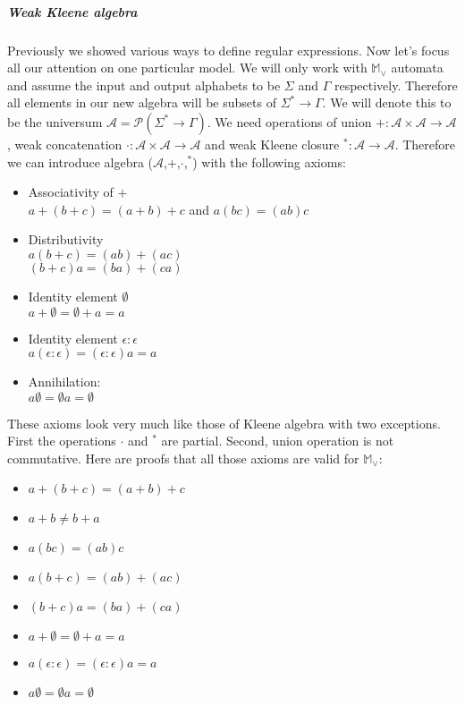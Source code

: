 \documentclass[12pt]{article}
\begin{document}
\subparagraph{ Weak Kleene algebra} Previously we showed various ways to define regular expressions. Now let's focus all our attention on one particular model. We will only work with $\mathbb{ M}_\vee$ automata and assume the input and output alphabets to be $\Sigma$ and $\Gamma$ respectively. Therefore all elements in our new algebra will be subsets of $\Sigma^* \rightarrow \Gamma$. We will denote this to be the universum $\mathcal{A} = \mathcal{P}(\Sigma^* \rightarrow \Gamma)$. We need operations of union $+ : \mathcal{A} \times \mathcal{A} \rightarrow \mathcal{A} $, weak concatenation $\cdot : \mathcal{A} \times \mathcal{A} \rightarrow \mathcal{A} $ and weak Kleene closure $^* : \mathcal{A} \rightarrow \mathcal{A} $. Therefore we can introduce  algebra ($\mathcal{A}$,$+$,$\cdot$,$^*$) with the following axioms:
\begin{itemize}
	\item Associativity of $+$ \\
	$a + (b + c) = (a + b) + c$ and $a(bc) = (ab)c$
	\item Distributivity \\
	 $a(b + c) = (ab) + (ac)$ \\
	 $(b + c)a = (ba) + (ca)$
	 \item Identity element $\emptyset$  \\
	 $a + \emptyset = \emptyset + a = a$
	 \item Identity element $\epsilon:\epsilon$  \\
	 $a (\epsilon:\epsilon) = (\epsilon:\epsilon) a = a$  
	 \item Annihilation: \\
	  $a\emptyset = \emptyset a = \emptyset$
\end{itemize}
These axioms look very much like those of Kleene algebra with two exceptions. First the operations $\cdot$ and $^*$ are partial. Second, union operation is not commutative. Here are proofs that all those axioms are valid for  $\mathbb{ M}_\vee$:
\begin{itemize}
	\item $a + (b + c) = (a + b) + c$ \\
	
	\item $ a + b \ne b + a $
	\item $a(bc) = (ab)c$
	\item $a(b + c) = (ab) + (ac)$ 
	\item $(b + c)a = (ba) + (ca)$
	\item $a + \emptyset = \emptyset + a = a$
	\item $a (\epsilon:\epsilon) = (\epsilon:\epsilon) a = a$  
	\item $a\emptyset = \emptyset a = \emptyset$
\end{itemize}
\end{document}
